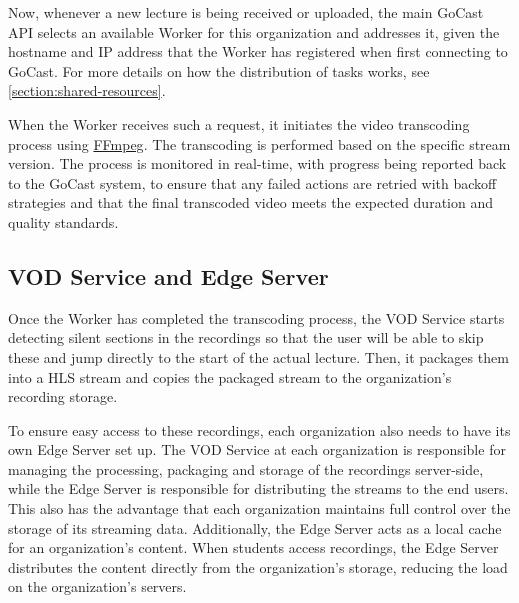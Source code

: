 Now, whenever a new lecture is being received or uploaded, the main GoCast \ac{API} selects an available Worker for this organization and addresses it, given the hostname and IP address that the Worker has registered when first connecting to GoCast. For more details on how the distribution of tasks works, see \autoref{section:shared-resources}.

When the Worker receives such a request, it initiates the video transcoding process using \href{https://ffmpeg.org/}{FFmpeg}. The transcoding is performed based on the specific stream version\footnotemark[6]. 
The process is monitored in real-time, with progress being reported back to the GoCast system, to ensure that any failed actions are retried with backoff strategies and that the final transcoded video meets the expected duration and quality standards.


\subsection{VOD Service and Edge Server}

Once the Worker has completed the transcoding process, the VOD Service starts detecting silent sections in the recordings so that the user will be able to skip these and jump directly to the start of the actual lecture. Then, it packages them into a \ac{HLS} stream and copies the packaged stream to the organization's recording storage.

To ensure easy access to these recordings, each organization also needs to have its own Edge Server set up. The VOD Service at each organization is responsible for managing the processing, packaging and storage of the recordings server-side, while the Edge Server is responsible for distributing the streams to the end users. This also has the advantage that each organization maintains full control over the storage of its streaming data.
Additionally, the Edge Server acts as a local cache for an organization's content. When students access recordings, the Edge Server distributes the content directly from the organization's storage, reducing the load on the organization's servers.

